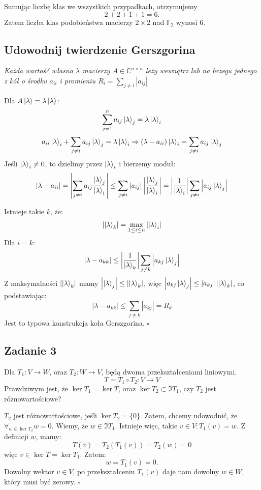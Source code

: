 \documentclass{../notatki}
\begin{document}
Sumując liczbę klas we wszystkich przypadkach, otrzymujemy
$$
2+2+1+1=6.
$$
Zatem liczba klas podobieństwa macierzy $2\times 2$ nad $\mathbb{F}_2$ wynosi 6.

\subsection{Udowodnij twierdzenie Gerszgorina}

\textit{Każda wartość własna $\lambda$ macierzy $A \in \mathbb{C}^{n \times n}$
  leży wewnątrz lub na brzegu jednego z kół o środku $a_{ii}$ i
  promieniu $R_i = \sum_{j \neq i} |a_{ij}|$
}

Dla $A \ket{\lambda} = \lambda \ket{\lambda}$:
$$
\sum_{j = 1}^n a_{ij} \ket{\lambda}_j = \lambda \ket{\lambda}_i
$$
$$
a_{ii}\ket{\lambda}_i + \sum_{j \neq i} a_{ij} \ket{\lambda}_j =
\lambda \ket{\lambda}_i
\Rightarrow (\lambda - a_{ii})\ket{\lambda}_i = \sum_{j \neq i}
a_{ij} \ket{\lambda}_j
$$
Jeśli $\ket{\lambda}_i \neq 0$, to dzielimy przez $\ket{\lambda}_i$ i
bierzemy moduł:
$$
|\lambda - a_{ii}| = \left|\sum_{j \neq i} a_{ij}
\frac{\ket{\lambda}_j}{\ket{\lambda}_i}\right| \leq \sum_{j \neq i}
|a_{ij}| \left|\frac{\ket{\lambda}_j}{\ket{\lambda}_i}\right| =
\left|\frac{1}{\ket{\lambda}_i}\right|\sum_{j \neq i} \left|a_{ij}
\ket{\lambda}_j\right|
$$

Istnieje takie $k$, że:
$$
\left|\ket{\lambda}_k\right| = \max_{1 \leq i \leq n}
\left|\ket{\lambda}_i\right|
$$
Dla $i = k$:
$$
\left|\lambda - a_{kk}\right| \leq
\left|\frac{1}{\ket{\lambda}_k}\right|\sum_{j \neq k} \left|a_{kj}
\ket{\lambda}_j\right|
$$
Z maksymalności $\left|\ket{\lambda}_k\right|$ mamy
$\left|\ket{\lambda}_j\right|
\leq \left|\ket{\lambda}_k\right|$, więc $\left|a_{kj}
\ket{\lambda}_j\right| \leq |a_{kj}|
\left|\ket{\lambda}_k\right|$, co podstawiając:
$$
\left|\lambda - a_{kk}\right| \leq \sum_{j \neq k} |a_{kj}| = R_k
$$
Jest to typowa konstrukcja koła Gerszgorina. $\square$

\subsection{Zadanie 3}

Dla $T_1: V \to W$, oraz $T_2: W \to V$, będą dwoma przekształceniami liniowymi.
$$
T = T_1 \circ T_2: V \to V
$$
Prawdziwym jest, że $\ker T_1 = \ker T$, oraz $\ker T_2 \subset \Im T_1$,
czy $T_2$ jest różnowartościowe?

$T_2$ jest różnowartościowe, jeśli $\ker T_2 = \{0\}$. Zatem, chcemy udowodnić,
że $\forall_{w \in \ker T_2} w = 0$. Wiemy, że $w \in \Im T_1$. Istnieje więc,
takie $v \in V : T_1(v) = w$. Z definicji $w$, mamy:
$$
T(v) = T_2(T_1(v)) = T_2(w) = 0
$$
więc $v \in \ker T = \ker T_1$. Zatem:
$$
w = T_1(v) = 0.
$$
Dowolny wektor $v \in V$, po przekształceniu $T_1(v)$ daje nam
dowolny $w \in W$, który musi być zerowy. $\square$
\end{document}

